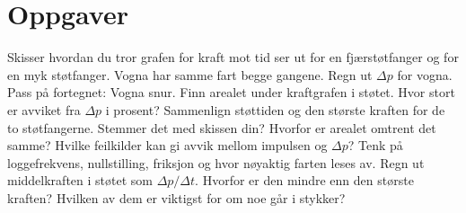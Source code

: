 \documentclass[11pt]{article}
\begin{document}
\section*{Oppgaver}

\begin{oppgaveliste}
\oppgave {}Skisser hvordan du tror grafen for kraft mot tid ser ut for en fjærstøtfanger og for en myk støtfanger. Vogna har samme fart begge gangene.
\svar
\oppgave {}Regn ut $Δp$ for vogna. Pass på fortegnet: Vogna snur.
\svar
\oppgave {}Finn arealet under kraftgrafen i støtet. Hvor stort er avviket fra $Δp$ i prosent?
\svar
\oppgave {}Sammenlign støttiden og den største kraften for de to støtfangerne. Stemmer det med skissen din? Hvorfor er arealet omtrent det samme?
\svar
\oppgave {}Hvilke feilkilder kan gi avvik mellom impulsen og $Δp$? Tenk på loggefrekvens, nullstilling, friksjon og hvor nøyaktig farten leses av.
\svar
\oppgave {}Regn ut middelkraften i støtet som $Δp/Δt$. Hvorfor er den mindre enn den største kraften? Hvilken av dem er viktigst for om noe går i stykker?
\svar
\end{oppgaveliste}
\end{document}
